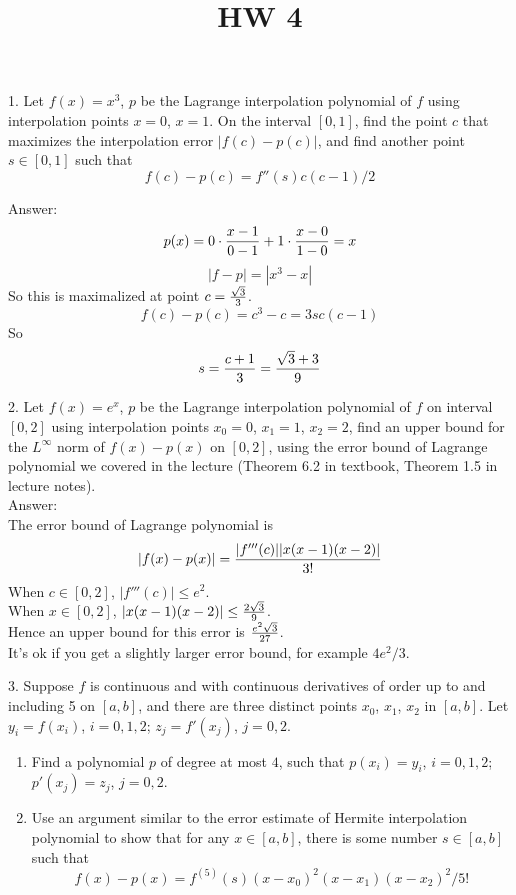 \documentclass[20pt]{article} %
\title{HW 4}
\theoremstyle{break}
\begin{document}
\maketitle

1. Let $f(x)=x^3$, $p$ be the Lagrange interpolation polynomial of $f$ using interpolation points $x=0$, $x=1$.  On the interval $[0, 1]$, find the point $c$ that maximizes the interpolation error $|f(c)-p(c)|$, and find another point $s\in [0, 1]$ such that
\[f(c)-p(c)=f''(s)c(c-1)/2\]

Answer:\\

\[p(x)=0\cdot{x-1\over 0-1}+1\cdot{x-0\over 1-0}=x\]
\[|f-p|=|x^3-x|\]
So this is maximalized at point $c={\sqrt{3}\over 3}$.
\[f(c)-p(c)=c^3-c=3sc(c-1)\]
So
\[s={c+1\over 3}={\sqrt{3}+3\over 9}\]

\newpage

2. Let $f(x)=e^x$, $p$ be the Lagrange interpolation polynomial of $f$ on interval $[0, 2]$ using interpolation points $x_0=0$, $x_1=1$, $x_2=2$, find an upper bound for the $L^\infty$ norm of $f(x)-p(x)$ on $[0, 2]$, using the error bound of Lagrange polynomial we covered in the lecture (Theorem 6.2 in textbook, Theorem 1.5 in lecture notes).\\

Answer:\\

The error bound of Lagrange polynomial is
\[|f(x)-p(x)|={|f'''(c)||x(x-1)(x-2)|\over 3!}\]
When $c\in [0, 2]$, $|f'''(c)|\leq e^2$.\\
When $x\in [0, 2]$, $|x(x-1)(x-2)|\leq {2\sqrt{3}\over 9}$.\\
Hence an upper bound for this error is $e^2\sqrt{3}\over 27$.\\
It's ok if you get a slightly larger error bound, for example $4e^2/3$.\\

\newpage

3. Suppose $f$ is continuous and with continuous derivatives of order up to and including 5 on $[a, b]$, and there are three distinct points $x_0$, $x_1$, $x_2$ in $[a, b]$. Let $y_i=f(x_i)$, $i=0, 1, 2$; $z_j=f'(x_j)$, $j=0, 2$.
\begin{enumerate}
\item Find a polynomial $p$ of degree at most $4$, such that $p(x_i)=y_i$, $i=0, 1, 2$; $p'(x_j)=z_j$, $j=0, 2$.
\item Use an argument similar to the error estimate of Hermite interpolation polynomial to show that for any $x\in [a, b]$, there is some number $s\in [a, b]$ such that
  \[f(x)-p(x)=f^{(5)}(s)(x-x_0)^2(x-x_1)(x-x_2)^2/5!\]
\end{enumerate}
\end{document}
